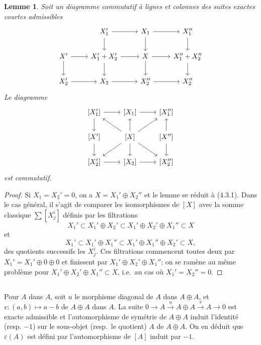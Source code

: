\documentclass[12pt,a4paper]{article}
\theoremstyle{plain}
\newtheorem{lemma}[theorem]{Lemme}
\theoremstyle{definition}
\begin{document}
\begin{lemma}
Soit un diagramme commutatif \`a lignes et colonnes des suites exactes
courtes admissibles
\[
\begin{tikzcd}
& X_1' \arrow[r] \arrow[d] & X_1 \arrow[r] \arrow[d] & X_1'' \arrow[d] \\
X' \arrow[r] \arrow[d] & X_1' + X_2' \arrow[r] \arrow[d] & X \arrow[r] \arrow[d] & X_1'' + X_2'' \arrow[d] \\
X_2' \arrow[r] & X_2 \arrow[r] & X_2'' \arrow[r] & X_2''
\end{tikzcd}
\]
Le diagramme
\[
\begin{tikzcd}
{[X_1']} \arrow[r] \arrow[d] & {[X_1]} \arrow[r] & {[X_1'']} \\
{[X']} \arrow[d] & {[X]} \arrow[u] \arrow[d] \arrow[ul] \arrow[ur] \arrow[dl] \arrow[dr] & {[X'']} \arrow[u] \arrow[d] \\
{[X_2']} \arrow[r] & {[X_2]} \arrow[r] & {[X_2'']}
\end{tikzcd}
\]
est commutatif.
\end{lemma}

\begin{proof}
Si $X_1 = X_2' = 0$, on a $X = X_1' \oplus X_2''$ et le lemme se r\'eduit \`a (4.3.1).
Dans le cas g\'en\'eral, il s'agit de comparer les isomorphismes de $[X]$ avec la
somme classique $\sum [X_j^i]$ d\'efinis par les filtrations
\[
X_1' \subset X_1' \oplus X_2' \subset X_1' \oplus X_2' \oplus X_1'' \subset X
\]
et
\[
X_1' \subset X_1' \oplus X_1'' \subset X_1' \oplus X_1'' \oplus X_2' \subset X,
\]
des quotients successifs les $X_j^i$. Ces filtrations commencent toutes deux par
$X_1' = X_1' \oplus 0 \oplus 0$ et finissent par $X_1' \oplus X_2' \oplus X_1''$; on se ram\`ene au m\^eme probl\`eme pour
$X_1' \oplus X_2' \oplus X_1'' \subset X$, i.e.\ au cas o\`u $X_1' = X_2'' = 0$.
\end{proof}

\subsection{}

Pour $A$ dans $A$, soit $u$ le morphisme diagonal de $A$ dans $A \oplus A$, et $v:
(a,b) \mapsto a - b$ de $A \oplus A$ dans $A$. La suite $0 \to A \xrightarrow{u} A \oplus A \xrightarrow{v} A \to 0$ est exacte
admissible et l'automorphisme de sym\'etrie de $A \oplus A$ induit l'identit\'e (resp.
$-1$) sur le sous-objet (resp.\ le quotient) $A$ de $A \oplus A$. On en d\'eduit que
$\varepsilon(A)$ est d\'efini par l'automorphisme de $[A]$ induit par $-1$.
\end{document}
